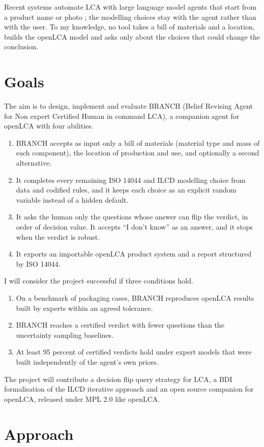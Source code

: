 \documentclass{article}
\begin{document}
Recent systems automate LCA with large language model agents that start from a product name or photo
\citep{zhang2026}; the modelling choices stay with the agent rather than with the user. To my knowledge,
no tool takes a bill of materials and a location, builds the openLCA model and asks only about the choices
that could change the conclusion.

\section{Goals}
The aim is to design, implement and evaluate BRANCH (Belief Revising Agent for Non expert Certified Human
in command LCA), a companion agent for openLCA with four abilities.
\begin{enumerate}
\item BRANCH accepts as input only a bill of materials (material type and mass of each component), the
location of production and use, and optionally a second alternative.
\item It completes every remaining ISO 14044 and ILCD modelling choice from data and codified rules, and
it keeps each choice as an explicit random variable instead of a hidden default.
\item It asks the human only the questions whose answer can flip the verdict, in order of decision value.
It accepts ``I don't know'' as an answer, and it stops when the verdict is robust.
\item It exports an importable openLCA product system and a report structured by ISO 14044.
\end{enumerate}
I will consider the project successful if three conditions hold.
\begin{enumerate}[label=(\roman*)]
\item On a benchmark of packaging cases, BRANCH reproduces openLCA results built by experts within an
agreed tolerance.
\item BRANCH reaches a certified verdict with fewer questions than the uncertainty sampling baselines.
\item At least 95 percent of certified verdicts hold under expert models that were built independently
of the agent's own priors.
\end{enumerate}
The project will contribute a decision flip query strategy for LCA, a BDI formalisation of the ILCD
iterative approach and an open source companion for openLCA, released under MPL 2.0 like openLCA.

\section{Approach}
\end{document}
